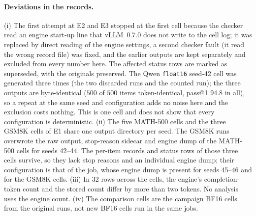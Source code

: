 \documentclass[11pt,a4paper]{article}
\begin{document}
\paragraph{Deviations in the records.}
(i) The first attempt at E2 and E3 stopped at the first cell because the checker read an engine start-up line that vLLM~0.7.0 does not write to the cell log; it was replaced by direct reading of the engine settings, a second checker fault (it read the wrong record file) was fixed, and the earlier outputs are kept separately and excluded from every number here. The affected status rows are marked as superseded, with the originals preserved. The Qwen \texttt{float16} seed-42 cell was generated three times (the two discarded runs and the counted run); the three outputs are byte-identical ($500$ of $500$ items token-identical, pass@1 $94.8$ in all), so a repeat at the same seed and configuration adds no noise here and the exclusion costs nothing. This is one cell and does not show that every configuration is deterministic.
(ii) The five MATH-500 cells and the three GSM8K cells of E1 share one output directory per seed. The GSM8K runs overwrote the raw output, stop-reason sidecar and engine dump of the MATH-500 cells for seeds 42--44. The per-item records and status rows of those three cells survive, so they lack stop reasons and an individual engine dump; their configuration is that of the job, whose engine dump is present for seeds 45--46 and for the GSM8K cells.
(iii) In 32 rows across the cells, the engine's completion-token count and the stored count differ by more than two tokens. No analysis uses the engine count.
(iv) The comparison cells are the campaign BF16 cells from the original runs, not new BF16 cells run in the same jobs.
\end{document}
